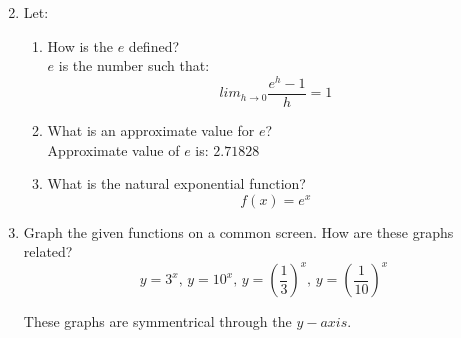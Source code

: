 \documentclass[12pt]{article}
\begin{document}
\begin{enumerate}
\setcounter{enumi}{1}
    \item Let:
    \begin{enumerate}
        \item How is the $e$ defined?\\
        $e$ is the number such that:
        \[lim_{h \to 0} \frac{e^h - 1}{h} = 1\]
        \item What is an approximate value for $e$?\\
        Approximate value of $e$ is: $2.71828$
        \item What is the natural exponential function?
        \[f(x) = e^x\]
    \end{enumerate}

\setcounter{enumi}{4}
        \item Graph the given functions on a common screen. How are these graphs related?
        \[y = 3^x \text{, } y = 10^x \text{, } y = (\frac{1}{3})^x \text{, }y = (\frac{1}{10})^x\]
        \begin{center}
        \end{center}
        These graphs are symmentrical through the $y-axis$.


\end{enumerate}
\end{document}
